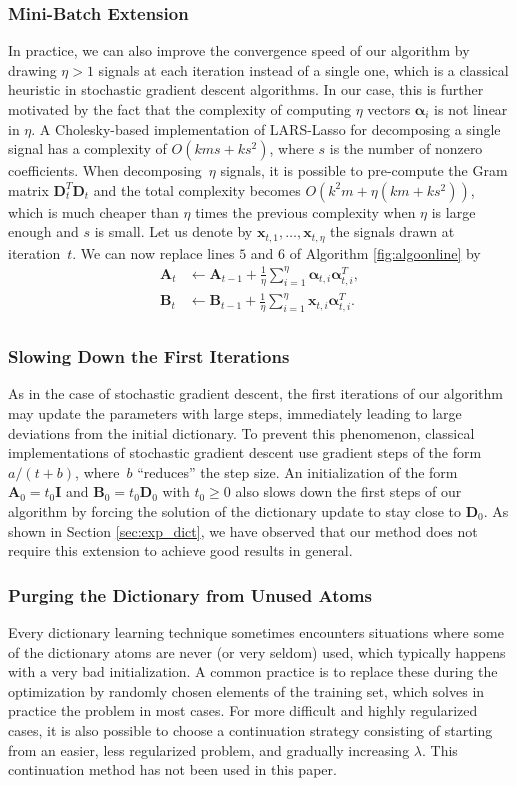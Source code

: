 \documentclass[twoside,11pt]{article}
\def\x{{\mathbf x}}
\def\alphab{{\boldsymbol\alpha}}
\def\D{{\mathbf D}}
\def\B{{\mathbf B}}
\def\O{{O}}
\def\A{{\mathbf A}}
\def\I{{\mathbf I}}
\begin{document}
\subsubsection{Mini-Batch Extension}
In practice, we can also improve the convergence speed of our algorithm by
drawing $\eta > 1$ signals at each iteration instead of a single
one, which is a classical heuristic in stochastic gradient descent
algorithms. In our case, this is further motivated by the fact that
the complexity of computing $\eta$ vectors $\alphab_i$ is not
linear in $\eta$. A Cholesky-based implementation of LARS-Lasso for decomposing
a single signal has a complexity of $\O(kms+ks^2)$, where $s$ is
the number of nonzero coefficients. When decomposing~$\eta$ signals,
it is possible to pre-compute the Gram matrix $\D_t^T\D_t$
and the total complexity becomes $\O(k^2m + \eta(km+ks^2))$, which 
is much cheaper than $\eta$ times the previous complexity when $\eta$ is
large enough and $s$ is small.  Let us denote by $\x_{t,1},\ldots,\x_{t,\eta}$ the signals drawn at
iteration~$t$. We can now replace lines $5$ and $6$ of
Algorithm
\ref{fig:algoonline} by
\begin{displaymath}
\begin{split}
   \A_t & \leftarrow \A_{t-1} + \frac{1}{\eta}\sum_{i=1}^\eta \alphab_{t,i}\alphab_{t,i}^T, \\
\B_t & \leftarrow \B_{t-1} + \frac{1}{\eta}\sum_{i=1}^\eta \x_{t,i}\alphab_{t,i}^T. \\
\end{split}
\end{displaymath}
\subsubsection{Slowing Down the First Iterations}
As in the case of stochastic gradient descent, the first iterations of our algorithm may
update the parameters with large steps, immediately leading to large
deviations from the initial dictionary.  To prevent this phenomenon,
classical implementations of stochastic gradient descent use gradient steps
of the form $a / (t+b)$, where~$b$ ``reduces'' the step size.  An
initialization of the form $\A_0 = t_0 \I$ and $\B_0 = t_0 \D_0$ with $t_0 \geq
0$ also slows down the first steps of our algorithm by forcing the solution of the
dictionary update to stay close to $\D_0$. As shown in Section
\ref{sec:exp_dict}, we have observed that our method does not require this extension
to achieve good results in general.
\subsubsection{Purging the Dictionary from Unused Atoms}
Every dictionary learning technique sometimes encounters situations where
some of the dictionary atoms are never (or very seldom) used, which typically
happens with a very bad initialization.  A common practice is to replace
these during the optimization by randomly chosen elements of the training
set, which solves in practice the problem in most cases. For more difficult
and highly regularized cases, it is also possible to choose 
a continuation strategy consisting of starting
from an easier, less regularized problem, and gradually increasing $\lambda$.
This continuation method has not been used in this paper.
\end{document}

